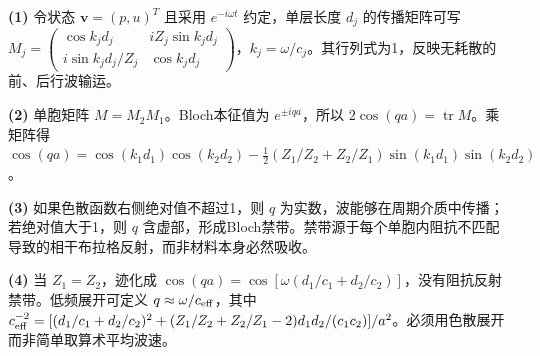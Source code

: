 \par\noindent\textbf{(1)} 令状态 \(\boldsymbol v=(p,u)^T\) 且采用 \(e^{-i\omega t}\) 约定，单层长度 \(d_j\) 的传播矩阵可写 \(M_j=\begin{pmatrix}\cos k_jd_j&iZ_j\sin k_jd_j\\i\sin k_jd_j/Z_j&\cos k_jd_j\end{pmatrix}\)，\(k_j=\omega/c_j\)。其行列式为1，反映无耗散的前、后行波输运。
\par\noindent\textbf{(2)} 单胞矩阵 \(M=M_2M_1\)。Bloch本征值为 \(e^{\pm iqa}\)，所以 \(2\cos(qa)=\operatorname{tr}M\)。乘矩阵得 \(\cos(qa)=\cos(k_1d_1)\cos(k_2d_2)-\frac12(Z_1/Z_2+Z_2/Z_1)\sin(k_1d_1)\sin(k_2d_2)\)。
\par\noindent\textbf{(3)} 如果色散函数右侧绝对值不超过1，则 \(q\) 为实数，波能够在周期介质中传播；若绝对值大于1，则 \(q\) 含虚部，形成Bloch禁带。禁带源于每个单胞内阻抗不匹配导致的相干布拉格反射，而非材料本身必然吸收。
\par\noindent\textbf{(4)} 当 \(Z_1=Z_2\)，迹化成 \(\cos(qa)=\cos[\omega(d_1/c_1+d_2/c_2)]\)，没有阻抗反射禁带。低频展开可定义 \(q\approx\omega/c_{\rm eff}\)，其中 \(c_{\rm eff}^{-2}=[(d_1/c_1+d_2/c_2)^2+(Z_1/Z_2+Z_2/Z_1-2)d_1d_2/(c_1c_2)]/a^2\)。必须用色散展开而非简单取算术平均波速。
